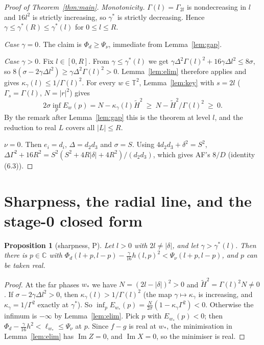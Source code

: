 \documentclass[11pt]{article}
\newtheorem{proposition}{Proposition}
\theoremstyle{remark}
\renewcommand{\Im}{\operatorname{Im}}
\newcommand{\T}{\mathbb{T}}
\newcommand{\C}{\mathbb{C}}
\begin{document}
\begin{proof}[Proof of Theorem~\ref{thm:main}]
\emph{Monotonicity.} $\Gamma(l)=\Gamma_{2l}$ is nondecreasing in $l$ and $16l^2$ is strictly increasing, so $\gamma^*$ is
strictly decreasing. Hence $\gamma\le\gamma^*(R)\le\gamma^*(l)$ for $0\le l\le R$.

\emph{Case $\gamma=0$.} The claim is $\Phi_d\ge\Psi_\nu$, immediate from Lemma~\ref{lem:gap}.

\emph{Case $\gamma>0$.} Fix $l\in[0,R]$. From $\gamma\le\gamma^*(l)$ we get $\gamma\Delta^2\Gamma(l)^2+16\gamma\Delta l^2\le8\sigma$,
so $8(\sigma-2\gamma\Delta l^2)\ge\gamma\Delta^2\Gamma(l)^2>0$. Lemma~\ref{lem:elim} therefore applies and gives
$\kappa_\gamma(l)\le1/\Gamma(l)^2$. For every $w\in\T^2$, Lemma~\ref{lem:key} with $s=2l$ ($\Gamma_s=\Gamma(l)$, $N=|r|^2$) gives
\[
2\sigma\inf_pE_w(p)=N-\kappa_\gamma(l)\widetilde H^2\ \ge\ N-\widetilde H^2/\Gamma(l)^2\ \ge\ 0 .
\]
By the remark after Lemma~\ref{lem:gap} this is the theorem at level $l$, and the reduction to real $L$ covers all $|L|\le R$.

\emph{$\nu=0$.} Then $e_i=d_i$, $\Delta=d_2d_3$ and $\sigma=S$. Using $4d_2d_3+\delta^2=S^2$,
$\Delta\Gamma^2+16R^2=S^2(S^2+4R|\delta|+4R^2)/(d_2d_3)$, which gives AF's $8/D$ (identity (6.3)).
\end{proof}

\section{Sharpness, the radial line, and the stage-0 closed form}

\begin{proposition}[sharpness, P]\label{prop:sharp}
Let $l>0$ with $2l\ne|\delta|$, and let $\gamma>\gamma^*(l)$. Then there is $p\in\C$ with
$\Phi_d(l+p,l-p)-\frac\gamma{16}h(l,p)^2<\Psi_\nu(l+p,l-p)$, and $p$ can be taken real.
\end{proposition}
\begin{proof}
At the far phases $w_*$ we have $N=(2l-|\delta|)^2>0$ and $\widetilde H^2=\Gamma(l)^2N\ne0$. If $\sigma-2\gamma\Delta l^2>0$, then
$\kappa_\gamma(l)>1/\Gamma(l)^2$ (the map $\gamma\mapsto\kappa_\gamma$ is increasing, and $\kappa_\gamma=1/\Gamma^2$ exactly at
$\gamma^*$). So $\inf_pE_{w_*}(p)=\frac{N}{2\sigma}(1-\kappa_\gamma\Gamma^2)<0$. Otherwise the infimum is $-\infty$ by
Lemma~\ref{lem:elim}. Pick $p$ with $E_{w_*}(p)<0$; then $\Phi_d-\frac\gamma{16}h^2<\ell_{w_*}\le\Psi_\nu$ at $p$. Since $f-g$ is
real at $w_*$, the minimisation in Lemma~\ref{lem:elim} has $\Im Z=0$, and $\Im X=0$, so the minimiser is real.
\end{proof}
\end{document}
